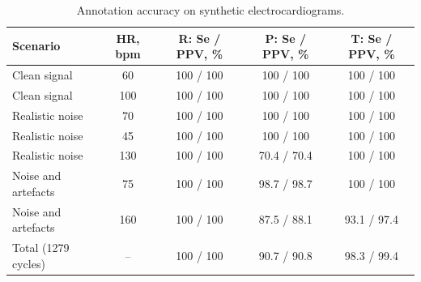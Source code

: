 \begin{table}[htbp]
\caption{Annotation accuracy on synthetic electrocardiograms.}
\label{tab:1}
\begin{center}\small
\begin{tabular}{|l|c|c|c|c|}
\hline
Scenario & HR, bpm & R: Se / PPV, \% & P: Se / PPV, \% & T: Se / PPV, \% \\
\hline
Clean signal & 60 & 100 / 100 & 100 / 100 & 100 / 100 \\
Clean signal & 100 & 100 / 100 & 100 / 100 & 100 / 100 \\
Realistic noise & 70 & 100 / 100 & 100 / 100 & 100 / 100 \\
Realistic noise & 45 & 100 / 100 & 100 / 100 & 100 / 100 \\
Realistic noise & 130 & 100 / 100 & 70.4 / 70.4 & 100 / 100 \\
Noise and artefacts & 75 & 100 / 100 & 98.7 / 98.7 & 100 / 100 \\
Noise and artefacts & 160 & 100 / 100 & 87.5 / 88.1 & 93.1 / 97.4 \\
\hline
Total (1279 cycles) & -- & 100 / 100 & 90.7 / 90.8 & 98.3 / 99.4 \\
\hline
\end{tabular}
\end{center}\vs{-4mm}
\end{table}
